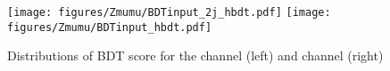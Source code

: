 \begin{figure}[htbp]
  \centering
 \texttt{[image: figures/Zmumu/BDTinput\_2j\_hbdt.pdf]}
 \texttt{[image: figures/Zmumu/BDTinput\_hbdt.pdf]}
\caption{Distributions of BDT score for the \twocentral channel (left) and \fourcentral channel (right)}
  \label{fig:ZmmBDTInputsScore}
\end{figure}




\FloatBarrier
